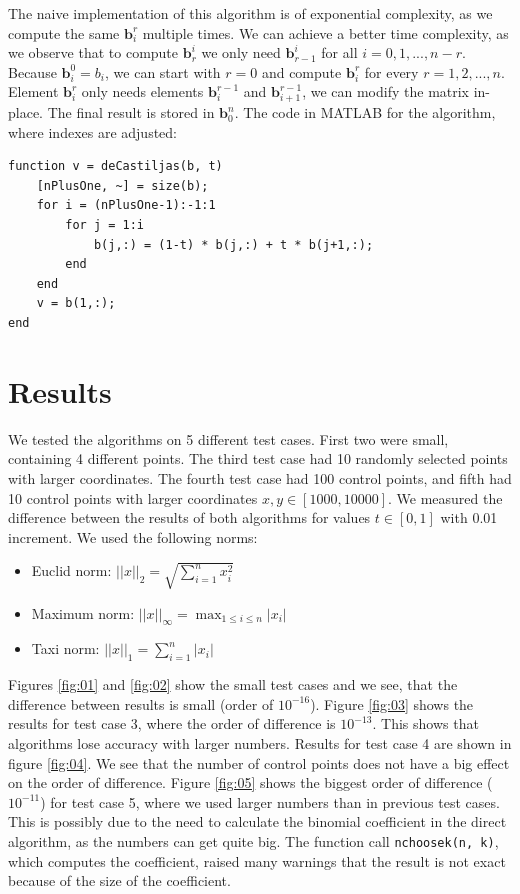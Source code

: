 \documentclass[]{article}
\begin{document}
The naive implementation of this algorithm is of exponential complexity, as we
compute the same $\textbf{b}_i^r$ multiple times. We can achieve a better time
complexity, as we observe that to compute $\textbf{b}_r^i$ we only need
$\textbf{b}_{r-1}^i$ for all $i = 0, 1, ..., n - r$. Because $\textbf{b}_i^0 =
b_i$, we can start with $r = 0$ and compute $\textbf{b}_i^r$ for every $r = 1,
2, ..., n$. Element $\textbf{b}^r_i$ only needs elements $\textbf{b}^{r-1}_i$
and $\textbf{b}^{r-1}_{i+1}$, we can modify the matrix in-place. The final
result is stored in $\textbf{b}^n_0$. The code in MATLAB for the algorithm,
where indexes are adjusted:

\begin{lstlisting}
function v = deCastiljas(b, t)
    [nPlusOne, ~] = size(b);
    for i = (nPlusOne-1):-1:1
        for j = 1:i
            b(j,:) = (1-t) * b(j,:) + t * b(j+1,:);
        end
    end
    v = b(1,:);
end
\end{lstlisting}

\section{Results}

We tested the algorithms on 5 different test cases. First two were small,
containing 4 different points. The third test case had 10 randomly selected
points with larger coordinates. The fourth test case had 100 control points, and
fifth had 10 control points with larger coordinates $x, y \in [1000, 10000]$. We
measured the difference between the results of both algorithms for values $t \in
[0, 1]$ with 0.01 increment. We used the following norms:
\begin{itemize}
	\item Euclid norm: $\lvert \lvert x \rvert \rvert_2 = \sqrt{\sum_{i = 1}^{n}
x_i^2}$
	\item Maximum norm: $\lvert \lvert x \rvert \rvert_\infty = \max_{1 \leq i
\leq n} \lvert x_i \rvert$
	\item Taxi norm: $\lvert \lvert x \rvert \rvert_1 = \sum_{i = 1}^{n} \lvert
x_i \rvert$
\end{itemize}

Figures \ref{fig:01} and \ref{fig:02} show the small test cases and we see, that
the difference between results is small (order of $10^{-16}$). Figure
\ref{fig:03} shows the results for test case 3, where the order of difference is
$10^{-13}$. This shows that algorithms lose accuracy with larger
numbers. Results for test case 4 are shown in figure \ref{fig:04}. We see that
the number of control points does not have a big effect on the order of
difference. Figure \ref{fig:05} shows the biggest order of difference
($10^{-11}$) for test case 5, where we used larger numbers than in previous test
cases. This is possibly due to the need to calculate the binomial coefficient in
the direct algorithm, as the numbers can get quite big. The function call
\verb|nchoosek(n, k)|, which computes the coefficient, raised many warnings that
the result is not exact because of the size of the coefficient.
\end{document}
